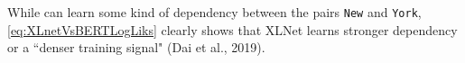 While  can learn some kind of dependency between the pairs \texttt{New} and \texttt{York}, \cref{eq:XLnetVsBERTLogLiks} clearly shows that XLNet learns stronger dependency or a ``denser training signal" (Dai et al., 2019). 






% 
% 


